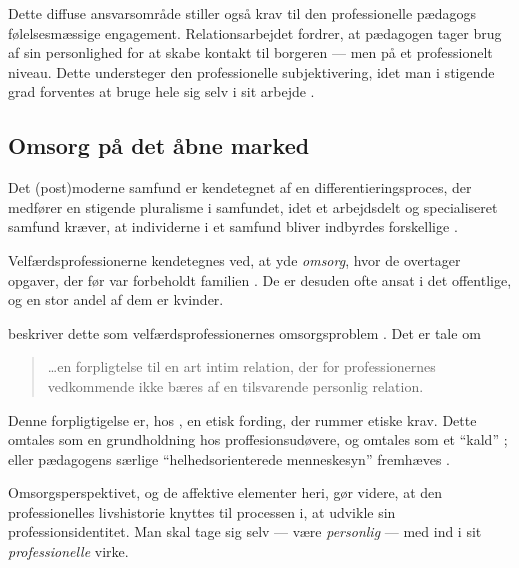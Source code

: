 Dette diffuse ansvarsområde stiller også krav til den professionelle pædagogs følelsesmæssige engagement. Relationsarbejdet fordrer, at pædagogen tager brug af sin personlighed for at skabe kontakt til borgeren — men på et professionelt niveau. Dette understeger den professionelle subjektivering, idet man i stigende grad forventes at bruge hele sig selv i sit arbejde \autocite[s. 71f]{mik-meyerIndledningSkabeProfessionel2012}.

\subsection{Omsorg på det åbne marked}
Det (post)moderne samfund er kendetegnet af en differentieringsproces, der medfører en stigende pluralisme i samfundet, idet et arbejdsdelt og specialiseret samfund kræver, at individerne i et samfund bliver indbyrdes forskellige \autocite[s. 32f]{hansbolKonstruktionAfProfessionel2008}.

Velfærdsprofessionerne kendetegnes ved, at yde \textit{omsorg}, hvor de overtager opgaver, der før var forbeholdt familien \autocite[s. 445]{frederiksenVelfaerdsprofessionerMellemOmsorg2017}.
De er desuden ofte ansat i det offentlige, og en stor andel af dem er kvinder.

\citeauthor{frederiksenVelfaerdsprofessionerMellemOmsorg2017} beskriver dette som velfærdsprofessionernes omsorgsproblem \autocite[s.455ff]{frederiksenVelfaerdsprofessionerMellemOmsorg2017}.
Det er tale om
\begin{quote}
  \ldots en forpligtelse til en art intim relation, der for professionernes vedkommende ikke bæres af en tilsvarende personlig relation. \autocite[s. 456]{frederiksenVelfaerdsprofessionerMellemOmsorg2017}
\end{quote}

Denne forpligtigelse er, hos \citeauthor{frederiksenVelfaerdsprofessionerMellemOmsorg2017}, en etisk fording, der rummer etiske krav.
Dette omtales som en grundholdning hos proffesionsudøvere, og omtales som et “kald” \autocite[s. 457]{frederiksenVelfaerdsprofessionerMellemOmsorg2017}; eller pædagogens særlige “helhedsorienterede menneskesyn” fremhæves \autocite{socialpaedagogerneSocialpaedagogiskeKernefaglighed2015}. 

Omsorgsperspektivet, og de affektive elementer heri, gør videre, at den professionelles livshistorie knyttes til processen i, at udvikle sin professionsidentitet.
Man skal tage sig selv — være \textit{personlig} — med ind i sit \textit{professionelle} virke.
\autocite[s. 457f]{frederiksenVelfaerdsprofessionerMellemOmsorg2017}

